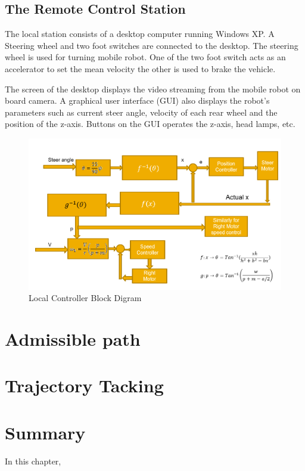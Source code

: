 \subsection{The Remote Control Station}   
The local station consists of a desktop computer running Windows XP. A Steering wheel and two foot switches are connected to the desktop. The steering wheel is used for turning  mobile robot. One of the two foot switch acts as an accelerator to set the mean velocity the other  is used to brake the vehicle.

The screen of the desktop displays the video streaming  from the mobile robot on board camera. A graphical user  interface (GUI) also displays the robot's parameters such as current steer angle, velocity of each rear wheel and the position of the z-axis. Buttons on the GUI operates the z-axis, head lamps, etc.

\begin{figure}[hbtp]
\centering
\includegraphics[scale=.5]{Chapter5/fig/BlkDigLocal.png}
\caption{Local Controller Block Digram}
\label{localBlock}
\end{figure}


\section{Admissible path}
\section{Trajectory Tacking}


\section{Summary}
In this chapter, 
